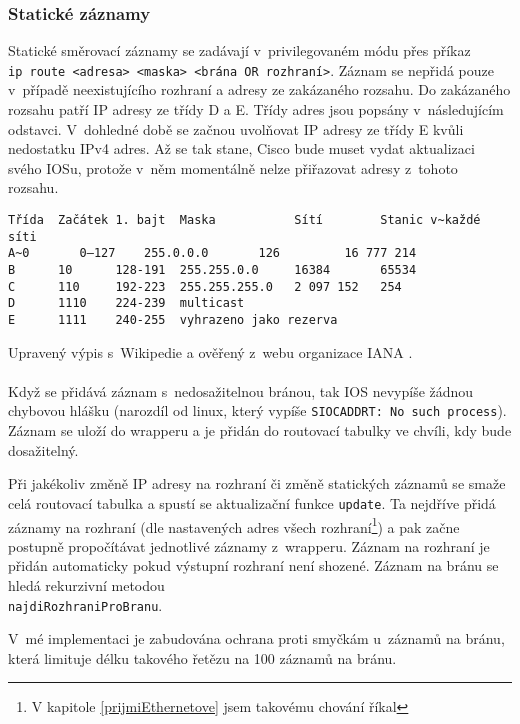 \subsubsection{Statické záznamy}
Statické směrovací záznamy se zadávají v~privilegovaném módu přes příkaz \\\verb|ip route <adresa> <maska> <brána OR rozhraní>|. Záznam se nepřidá pouze v~případě neexistujícího rozhraní a adresy ze zakázaného rozsahu. Do zakázaného rozsahu patří IP adresy ze třídy D a E. Třídy adres jsou popsány v~následujícím odstavci. V~dohledné době se začnou uvolňovat IP adresy ze třídy E kvůli nedostatku IPv4 adres. Až se tak stane, Cisco bude muset vydat aktualizaci svého IOSu, protože v~něm momentálně nelze přiřazovat adresy z~tohoto rozsahu.
\begin{verbatim}
Třída  Začátek 1. bajt  Maska           Sítí        Stanic v~každé síti
A~0       0–127    255.0.0.0       126         16 777 214
B      10      128-191  255.255.0.0     16384       65534
C      110     192-223  255.255.255.0   2 097 152   254
D      1110    224-239  multicast
E      1111    240-255  vyhrazeno jako rezerva
\end{verbatim}
Upravený výpis s~Wikipedie \cite{wiki:ip} a ověřený z~webu organizace IANA \cite{iana}.

\paragraph{}
Když se přidává záznam s~nedosažitelnou bránou, tak IOS nevypíše žádnou chybovou hlášku (narozdíl od linux, který vypíše \verb|SIOCADDRT: No such process|). Záznam se uloží do wrapperu a je přidán do routovací tabulky ve chvíli, kdy bude dosažitelný. 

Při jakékoliv změně IP adresy na rozhraní či změně statických záznamů se smaže celá routovací tabulka a spustí se aktualizační funkce \verb|update|. Ta nejdříve přidá záznamy na rozhraní (dle nastavených adres všech rozhraní\footnote{V kapitole \ref{prijmiEthernetove} jsem takovému chování říkal }) a pak začne postupně propočítávat jednotlivé záznamy z~wrapperu. Záznam na rozhraní je přidán automaticky pokud výstupní rozhraní není shozené. Záznam na bránu se hledá rekurzivní metodou\\\verb|najdiRozhraniProBranu|.

V~mé implementaci je zabudována ochrana proti smyčkám u~záznamů na bránu, která limituje délku takového řetězu na 100 záznamů na bránu.


